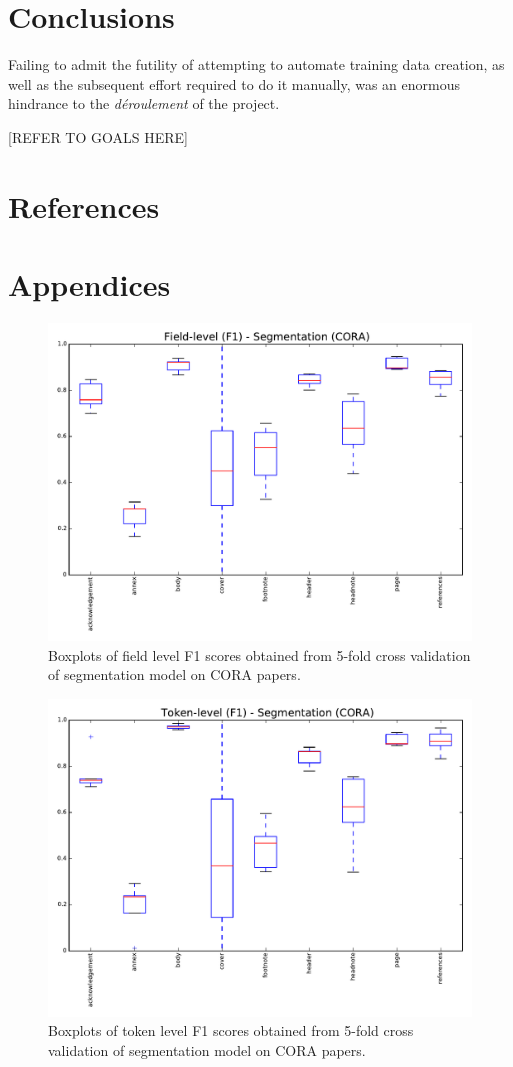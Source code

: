 \documentclass[11pt, oneside]{scrartcl}   	%
\begin{document}
\section{Conclusions}

Failing to admit the futility of attempting to automate training data creation, as well as the subsequent effort required to do it manually, was an enormous hindrance to the \emph{d\'eroulement} of the project.

[REFER TO GOALS HERE]

\section{References}



\section{Appendices}

\begin{figure}[!ht]
\center
\includegraphics[width=6in]{figures/boxplot-field-level.pdf}
\caption{Boxplots of field level F1 scores obtained from 5-fold cross validation of segmentation model on CORA papers.}
\end{figure}

\begin{figure}[!ht]
\center
\includegraphics[width=6in]{figures/boxplot-token-level.pdf}
\caption{Boxplots of token level F1 scores obtained from 5-fold cross validation of segmentation model on CORA papers.}
\end{figure}
\end{document}
